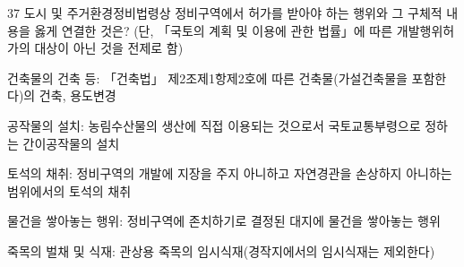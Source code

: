 \begin{question}{37}
도시 및 주거환경정비법령상 정비구역에서 허가를 받아야 하는 행위와 그 구체적 내용을 옳게 연결한 것은? (단, 「국토의 계획 및 이용에 관한 법률」에 따른 개발행위허가의 대상이 아닌 것을 전제로 함)
\begin{choices}
  \item 건축물의 건축 등: 「건축법」 제2조제1항제2호에 따른 건축물(가설건축물을 포함한다)의 건축, 용도변경
  \item 공작물의 설치: 농림수산물의 생산에 직접 이용되는 것으로서 국토교통부령으로 정하는 간이공작물의 설치
  \item 토석의 채취: 정비구역의 개발에 지장을 주지 아니하고 자연경관을 손상하지 아니하는 범위에서의 토석의 채취
  \item 물건을 쌓아놓는 행위: 정비구역에 존치하기로 결정된 대지에 물건을 쌓아놓는 행위
  \item 죽목의 벌채 및 식재: 관상용 죽목의 임시식재(경작지에서의 임시식재는 제외한다)
\end{choices}
\end{question}

